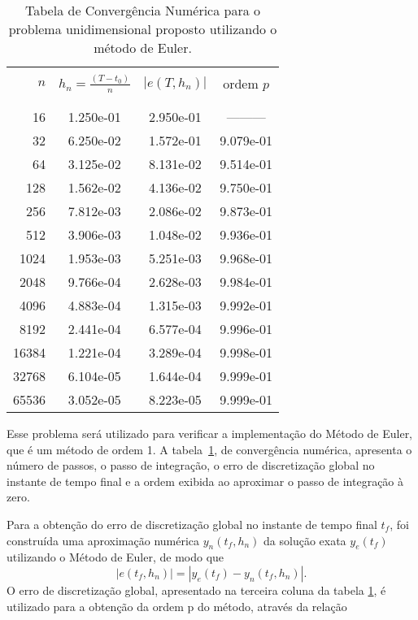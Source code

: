 \documentclass[12pt]{article}
\begin{document}
             \begin{table}[!ht]
    \centering
    \begin{tabular}{rccc}
    \hline\hline\\
          $n$ & $h_n=\displaystyle \frac{(T-t_0)}{n}$ 
              & $\left|e(T, h_n)\right|$  & ordem $p$\\\\
   \hline\hline\\

   16 & 1.250e-01 & 2.950e-01 & --------- \\
   32 & 6.250e-02 & 1.572e-01 & 9.079e-01 \\
   64 & 3.125e-02 & 8.131e-02 & 9.514e-01 \\
  128 & 1.562e-02 & 4.136e-02 & 9.750e-01 \\
  256 & 7.812e-03 & 2.086e-02 & 9.873e-01 \\
  512 & 3.906e-03 & 1.048e-02 & 9.936e-01 \\
 1024 & 1.953e-03 & 5.251e-03 & 9.968e-01 \\
 2048 & 9.766e-04 & 2.628e-03 & 9.984e-01 \\
 4096 & 4.883e-04 & 1.315e-03 & 9.992e-01 \\
 8192 & 2.441e-04 & 6.577e-04 & 9.996e-01 \\
16384 & 1.221e-04 & 3.289e-04 & 9.998e-01 \\
32768 & 6.104e-05 & 1.644e-04 & 9.999e-01 \\
65536 & 3.052e-05 & 8.223e-05 & 9.999e-01 \\
   
   \hline\hline \end{tabular}
   \caption{Tabela de Convergência Numérica para o problema unidimensional proposto utilizando o método de Euler.}
   \label{tabela1}
\end{table}
    \hspace{0.2cm}Esse problema será utilizado para verificar a implementação do Método de Euler, que é um método de ordem 1. A tabela~\ref{tabela1}, de convergência numérica, apresenta o número de passos, o passo de integração, o erro de discretização global no instante de tempo final e a ordem exibida ao aproximar o passo de integração à zero.
    
    \hspace{0.3cm}Para a obtenção do erro de discretização global no instante de tempo final \(t_f\), foi construída uma aproximação numérica \(y_n(t_f, h_n)\) da solução exata \(y_e(t_f)\) utilizando o Método de Euler, de modo que 
       \begin{equation}
       |e(t_f,h_n)| = |y_e(t_f) - y_n(t_f, h_n)|.
       \end{equation}
    \hspace{1cm}O erro de discretização global, apresentado na terceira coluna da tabela \ref{tabela1}, é utilizado para a obtenção da ordem p do método, através da relação
\end{document}
